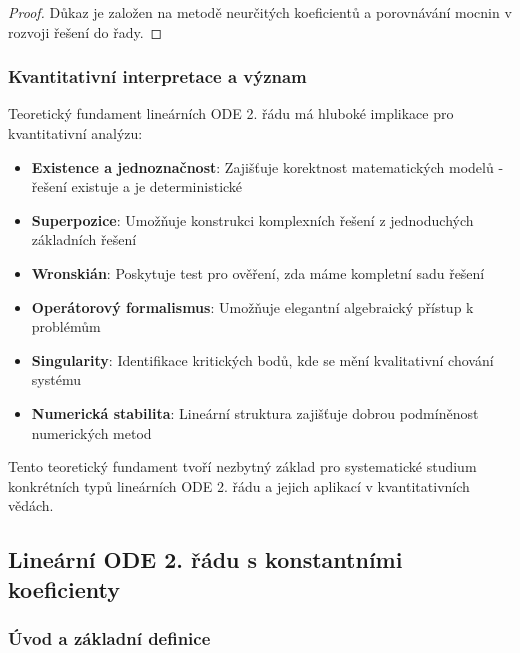 \begin{proof}
Důkaz je založen na metodě neurčitých koeficientů a porovnávání mocnin v rozvoji řešení do řady.
\end{proof}

\subsubsection{Kvantitativní interpretace a význam}
\label{subsubsec:kvantitativni-vyznam}

Teoretický fundament lineárních ODE 2. řádu má hluboké implikace pro kvantitativní analýzu:

\begin{itemize}
\item \textbf{Existence a jednoznačnost}: Zajišťuje korektnost matematických modelů - řešení existuje a je deterministické

\item \textbf{Superpozice}: Umožňuje konstrukci komplexních řešení z jednoduchých základních řešení

\item \textbf{Wronskián}: Poskytuje test pro ověření, zda máme kompletní sadu řešení

\item \textbf{Operátorový formalismus}: Umožňuje elegantní algebraický přístup k problémům

\item \textbf{Singularity}: Identifikace kritických bodů, kde se mění kvalitativní chování systému

\item \textbf{Numerická stabilita}: Lineární struktura zajišťuje dobrou podmíněnost numerických metod
\end{itemize}

Tento teoretický fundament tvoří nezbytný základ pro systematické studium konkrétních typů lineárních ODE 2. řádu a jejich aplikací v kvantitativních vědách.


\subsection{Lineární ODE 2. řádu s konstantními koeficienty}
\label{subsec:lin-ode-2-konst}

\subsubsection{Úvod a základní definice}
\label{subsubsec:uvod-konst-koef}

